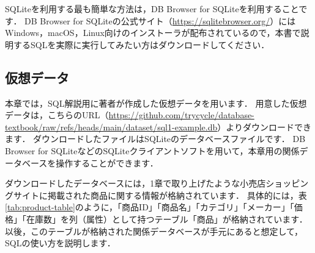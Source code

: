 SQLiteを利用する最も簡単な方法は，DB Browser for SQLiteを利用することです．
DB Browser for SQLiteの公式サイト（\url{https://sqlitebrowser.org/}）にはWindows，macOS，Linux向けのインストーラが配布されているので，本書で説明するSQLを実際に実行してみたい方はダウンロードしてください．

\subsection{仮想データ}
本章では，SQL解説用に著者が作成した仮想データを用います．
用意した仮想データは，こちらのURL（\url{https://github.com/trycycle/database-textbook/raw/refs/heads/main/dataset/sql1-example.db}）よりダウンロードできます．
ダウンロードしたファイルはSQLiteのデータベースファイルです．
DB Browser for SQLiteなどのSQLiteクライアントソフトを用いて，本章用の関係データベースを操作することができます．

ダウンロードしたデータベースには，1章で取り上げたような小売店ショッピングサイトに掲載された商品に関する情報が格納されています．
具体的には，表\ref{tab:product-table}のように，「商品ID」「商品名」「カテゴリ」「メーカー」「価格」「在庫数」を列（属性）として持つテーブル「商品」が格納されています．
以後，このテーブルが格納された関係データベースが手元にあると想定して，SQLの使い方を説明します．
\begin{table}[!htbp]
    \centering
    \caption{テーブル「商品」}
    \label{tab:product-table}
\end{table}


